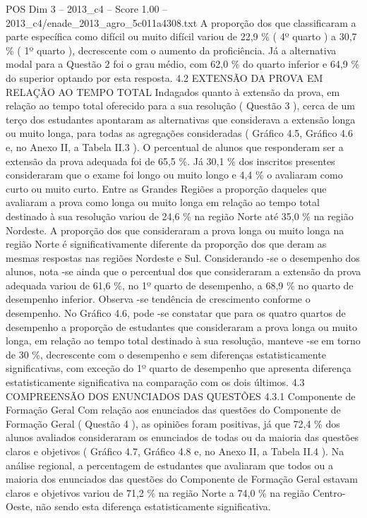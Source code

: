 \begin{textsample}{POS Dim 3 – 2013\_c4 – Score 1.00 – 2013\_c4/enade\_2013\_agro\_5c011a4308.txt}
A proporção dos que classificaram a parte específica como difícil ou muito difícil variou de 22,9 \% ( 4º quarto ) a 30,7 \% ( 1º quarto ), decrescente com o aumento da proficiência.
Já a alternativa modal para a Questão 2 foi o grau médio, com 62,0 \% do quarto inferior e 64,9 \% do superior optando por esta resposta. 4.2 EXTENSÃO DA PROVA EM RELAÇÃO AO TEMPO TOTAL Indagados quanto à extensão da prova, em relação ao tempo total oferecido para a sua resolução ( Questão 3 ), cerca de um terço dos estudantes apontaram as alternativas que considerava a extensão longa ou muito longa, para todas as agregações consideradas ( Gráfico 4.5, Gráfico 4.6 e, no Anexo II, a Tabela II.3 ).
O percentual de alunos que responderam ser a extensão da prova adequada foi de 65,5 \%.
Já 30,1 \% dos inscritos presentes consideraram que o exame foi longo ou muito longo e 4,4 \% o avaliaram como curto ou muito curto.
Entre as Grandes Regiões a proporção daqueles que avaliaram a prova como longa ou muito longa em relação ao tempo total destinado à sua resolução variou de 24,6 \% na região Norte até 35,0 \% na região Nordeste.
A proporção dos que consideraram a prova longa ou muito longa na região Norte é significativamente diferente da proporção dos que deram as mesmas respostas nas regiões Nordeste e Sul.
Considerando -se o desempenho dos alunos, nota -se ainda que o percentual dos que consideraram a extensão da prova adequada variou de 61,6 \%, no 1º quarto de desempenho, a 68,9 \% no quarto de desempenho inferior.
Observa -se tendência de crescimento conforme o desempenho.
No Gráfico 4.6, pode -se constatar que para os quatro quartos de desempenho a proporção de estudantes que consideraram a prova longa ou muito longa, em relação ao tempo total destinado à sua resolução, manteve -se em torno de 30 \%, decrescente com o desempenho e sem diferenças estatisticamente significativas, com exceção do 1º quarto de desempenho que apresenta diferença estatisticamente significativa na comparação com os dois últimos. 4.3 COMPREENSÃO DOS ENUNCIADOS DAS QUESTÕES 4.3.1 Componente de Formação Geral Com relação aos enunciados das questões do Componente de Formação Geral ( Questão 4 ), as opiniões foram positivas, já que 72,4 \% dos alunos avaliados consideraram os enunciados de todas ou da maioria das questões claros e objetivos ( Gráfico 4.7, Gráfico 4.8 e, no Anexo II, a Tabela II.4 ).
Na análise regional, a percentagem de estudantes que avaliaram que todos ou a maioria dos enunciados das questões do Componente de Formação Geral estavam claros e objetivos variou de 71,2 \% na região Norte a 74,0 \% na região Centro-Oeste, não sendo esta diferença estatisticamente significativa.

\end{textsample}
